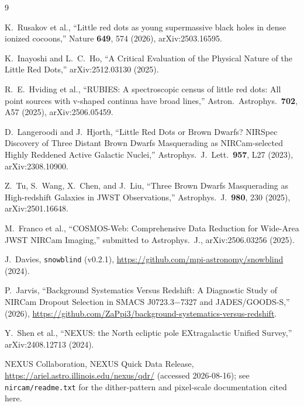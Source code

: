 \documentclass[11pt]{article}
\begin{document}
\begin{thebibliography}{9}

K.~Rusakov et al., ``Little red dots as young supermassive black holes in dense ionized cocoons,'' Nature \textbf{649}, 574 (2026), arXiv:2503.16595.

K.~Inayoshi and L.~C.~Ho, ``A Critical Evaluation of the Physical Nature of the Little Red Dots,'' arXiv:2512.03130 (2025).

R.~E.~Hviding et al., ``RUBIES: A spectroscopic census of little red dots: All point sources with v-shaped continua have broad lines,'' Astron.\ Astrophys.\ \textbf{702}, A57 (2025), arXiv:2506.05459.

D.~Langeroodi and J.~Hjorth, ``Little Red Dots or Brown Dwarfs? NIRSpec Discovery of Three Distant Brown Dwarfs Masquerading as NIRCam-selected Highly Reddened Active Galactic Nuclei,'' Astrophys.\ J.\ Lett.\ \textbf{957}, L27 (2023), arXiv:2308.10900.

Z.~Tu, S.~Wang, X.~Chen, and J.~Liu, ``Three Brown Dwarfs Masquerading as High-redshift Galaxies in JWST Observations,'' Astrophys.\ J.\ \textbf{980}, 230 (2025), arXiv:2501.16648.

M.~Franco et al., ``COSMOS-Web: Comprehensive Data Reduction for Wide-Area JWST NIRCam Imaging,'' submitted to Astrophys.\ J., arXiv:2506.03256 (2025).

J.~Davies, \texttt{snowblind} (v0.2.1), \url{https://github.com/mpi-astronomy/snowblind} (2024).

P.~Jarvis, ``Background Systematics Versus Redshift: A Diagnostic Study of NIRCam Dropout Selection in SMACS J0723.3$-$7327 and JADES/GOODS-S,'' (2026), \url{https://github.com/ZaPpi3/background-systematics-versus-redshift}.

Y.~Shen et al., ``NEXUS: the North ecliptic pole EXtragalactic Unified Survey,'' arXiv:2408.12713 (2024).

NEXUS Collaboration, NEXUS Quick Data Release, \url{https://ariel.astro.illinois.edu/nexus/qdr/} (accessed 2026-08-16); see \texttt{nircam/readme.txt} for the dither-pattern and pixel-scale documentation cited here.

\end{thebibliography}
\end{document}

